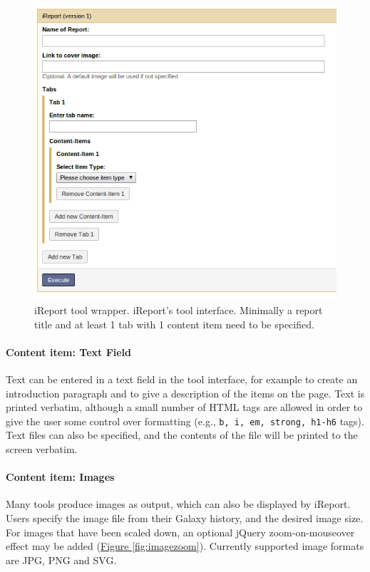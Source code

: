 \begin{figure}[h!]
    \centering
    \includegraphics[scale=0.5]{chapters/images/iReport/Hiltemann_wrapper.jpg}
    \caption{iReport tool wrapper. iReport's tool interface. Minimally a report title and at least 1 tab with 1 content item need to be specified.}
    \label{fig:wrapper}
\end{figure}

\paragraph*{Content item: Text Field}
Text can be entered in a text field in the tool interface, for example to create an introduction paragraph and to give a description of the items on the page. Text is printed verbatim, although a small number of HTML tags are allowed in order to give the user some control over formatting (e.g., \verb+b, i, em, strong, h1-h6+ tags). Text files can also be specified, and the contents of the file will be printed to the screen verbatim.

\paragraph*{Content item: Images}
Many tools produce images as output, which can also be displayed by iReport. Users specify the image file from their Galaxy history, and the desired image size. For images that have been scaled down, an optional jQuery zoom-on-mouseover effect may  be added (\hyperref[fig:imagezoom]{Figure \ref*{fig:imagezoom}})\cite{url-jqueryzoom}. Currently supported image formats are JPG, PNG and SVG.

